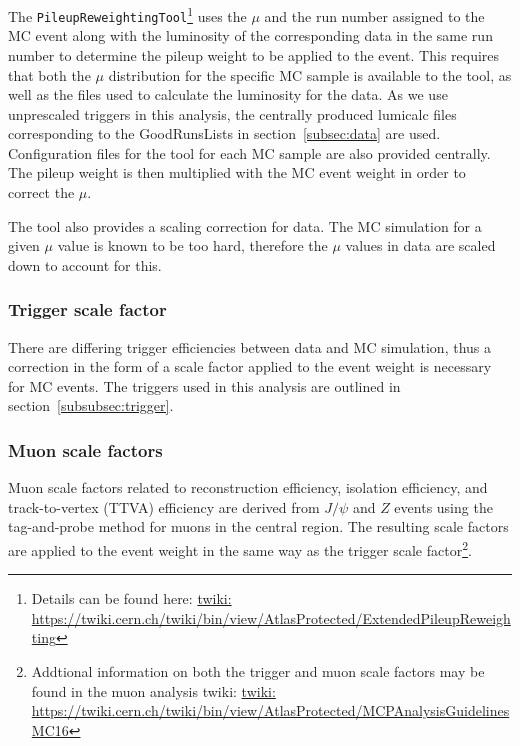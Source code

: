 The \texttt{PileupReweightingTool}\footnote{Details can be found here: \url{twiki: https://twiki.cern.ch/twiki/bin/view/AtlasProtected/ExtendedPileupReweighting}} uses the $\mu$ and the run number assigned to the MC event along with the luminosity of the corresponding data in the same run number to determine the pileup weight to be applied to the event.
This requires that both the $\mu$ distribution for the specific MC sample is available to the tool, as well as the files used to calculate the luminosity for the data. As we use unprescaled triggers in this analysis, the centrally produced lumicalc files corresponding to the GoodRunsLists in section~\ref{subsec:data} are used.
Configuration files for the tool for each MC sample are also provided centrally.
The pileup weight is then multiplied with the MC event weight in order to correct the $\mu$.

The tool also provides a scaling correction for data. The MC simulation for a given $\mu$ value is known to be too hard, therefore the $\mu$ values in data are scaled down to account for this.

\subsubsection{Trigger scale factor}
There are differing trigger efficiencies between data and MC simulation, thus a correction in the form of a scale factor applied to the event weight is necessary for MC events. The triggers used in this analysis are outlined in section~\ref{subsubsec:trigger}.

\subsubsection{Muon scale factors}
Muon scale factors related to reconstruction efficiency, isolation efficiency, and track-to-vertex (TTVA) efficiency are derived from $J/\psi$ and $Z$ events using the tag-and-probe method for muons in the central region. The resulting scale factors are applied to the event weight in the same way as the trigger scale
factor\footnote{Addtional information on both the trigger and muon scale factors may be found in the muon analysis twiki: \url{twiki: https://twiki.cern.ch/twiki/bin/view/AtlasProtected/MCPAnalysisGuidelinesMC16}}.

